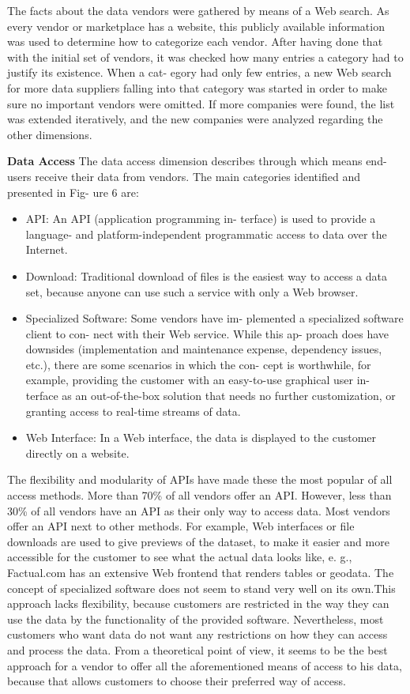 	The facts about the data vendors were gathered by means of a Web search. As every vendor or marketplace has a website, this publicly available information was used to determine how to categorize each vendor. After having done that with the initial set of vendors, it was checked how many entries a category had to justify its existence. When a cat- egory had only few entries, a new Web search for more data suppliers falling into that category was started in order to make sure no important vendors were omitted. If more companies were found, the list was extended iteratively, and the new companies were analyzed regarding the other dimensions.

	\textbf{Data Access}
	The data access dimension describes through which means end-users receive their data from vendors. The main categories identified and presented in Fig- ure 6 are: 
	\begin{itemize}
	\item API: An API (application programming in- terface) is used to provide a language- and platform-independent programmatic access to data over the Internet.
	\item Download: Traditional download of files is the easiest way to access a data set, because anyone can use such a service with only a Web browser. 
	\item Specialized Software: Some vendors have im- plemented a specialized software client to con- nect with their Web service. While this ap- proach does have downsides (implementation and maintenance expense, dependency issues, etc.), there are some scenarios in which the con- cept is worthwhile, for example, providing the customer with an easy-to-use graphical user in- terface as an out-of-the-box solution that needs no further customization, or granting access to real-time streams of data. 
	\item Web Interface: In a Web interface, the data is displayed to the customer directly on a website. 
	\end{itemize}

	The flexibility and modularity of APIs have made these the most popular of all access methods. More than 70\% of all vendors offer an API. However, less than 30\% of all vendors have an API as their only way to access data. Most vendors offer an API next to other methods. For example, Web interfaces or file downloads are used to give previews of the dataset, to make it easier and more accessible for the customer to see what the actual data looks like, e. g., Factual.com has an extensive Web frontend that renders tables or geodata. The concept of specialized software does not seem to stand very well on its own.This approach lacks flexibility, because customers are restricted in the way they can use the data by the functionality of the provided software. Nevertheless, most customers who want data do not want any restrictions on how they can access and process the data. From a theoretical point of view, it seems to be the best approach for a vendor to offer all the aforementioned means of access to his data, because that allows customers to choose their preferred way of access. 

